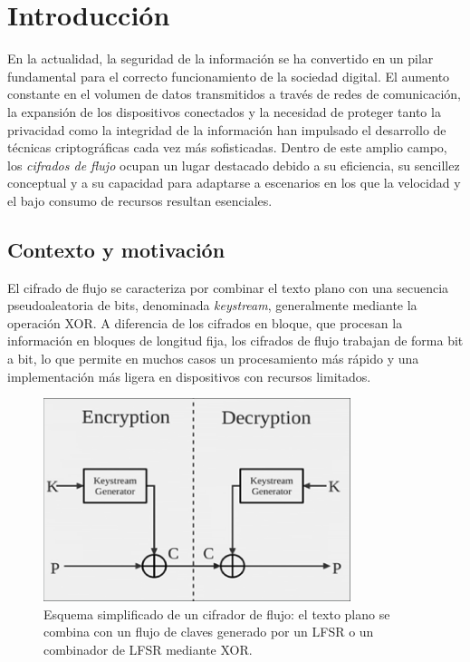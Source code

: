\chapter{Introducción}

En la actualidad, la seguridad de la información se ha convertido en un pilar
fundamental para el correcto funcionamiento de la sociedad digital. El aumento
constante en el volumen de datos transmitidos a través de redes de comunicación,
la expansión de los dispositivos conectados y la necesidad de proteger tanto la
privacidad como la integridad de la información han impulsado el desarrollo de
técnicas criptográficas cada vez más sofisticadas. Dentro de este amplio campo,
los \textit{cifrados de flujo} ocupan un lugar destacado debido a su eficiencia,
su sencillez conceptual y a su capacidad para adaptarse a escenarios en los que
la velocidad y el bajo consumo de recursos resultan esenciales.

\section*{Contexto y motivación}

El cifrado de flujo se caracteriza por combinar el texto plano con una secuencia
pseudoaleatoria de bits, denominada \textit{keystream}, generalmente mediante la
operación XOR. A diferencia de los cifrados en bloque, que procesan la
información en bloques de longitud fija, los cifrados de flujo trabajan de forma
bit a bit, lo que permite en muchos casos un procesamiento más rápido y una
implementación más ligera en dispositivos con recursos limitados.

\begin{figure}[h]
\centering
\includegraphics[width=0.8\textwidth]{figures/stream_cipher_scheme.png}
\caption{Esquema simplificado de un cifrador de flujo: el texto plano se combina
con un flujo de claves generado por un LFSR o un combinador de LFSR mediante XOR.}
\end{figure}


